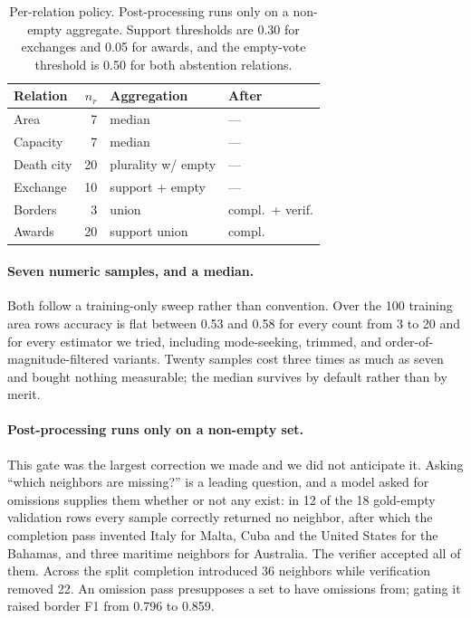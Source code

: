 \documentclass[11pt]{article}
\begin{document}
\begin{table}[t]
  \centering
  \small
  \begin{tabular}{@{}lrll@{}}
    \toprule
    Relation & $n_r$ & Aggregation & After \\
    \midrule
    Area & 7 & median & --- \\
    Capacity & 7 & median & --- \\
    Death city & 20 & plurality w/ empty & --- \\
    Exchange & 10 & support + empty & --- \\
    Borders & 3 & union & compl.\ + verif. \\
    Awards & 20 & support union & compl. \\
    \bottomrule
  \end{tabular}
  \caption{Per-relation policy. Post-processing runs only on a non-empty
  aggregate. Support thresholds are 0.30 for exchanges and 0.05 for awards, and
  the empty-vote threshold is 0.50 for both abstention relations.}
  \label{tab:policy}
\end{table}

\paragraph{Seven numeric samples, and a median.}
Both follow a training-only sweep rather than convention. Over the 100 training
area rows accuracy is flat between 0.53 and 0.58 for every count from 3 to 20
and for every estimator we tried, including mode-seeking, trimmed, and
order-of-magnitude-filtered variants. Twenty samples cost three times as much as
seven and bought nothing measurable; the median survives by default rather than
by merit.

\paragraph{Post-processing runs only on a non-empty set.}
This gate was the largest correction we made and we did not anticipate it.
Asking ``which neighbors are missing?'' is a leading question, and a model
asked for omissions supplies them whether or not any exist: in 12 of the 18
gold-empty validation rows every sample correctly returned no neighbor, after
which the completion pass invented Italy for Malta, Cuba and the United States
for the Bahamas, and three maritime neighbors for Australia. The verifier
accepted all of them. Across the split completion introduced 36 neighbors while
verification removed 22. An omission pass presupposes a set to have omissions
from; gating it raised border F1 from 0.796 to 0.859.
\end{document}
